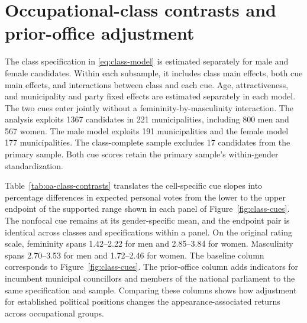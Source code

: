 \documentclass[11pt,a4paper]{article}\usepackage[]{graphicx}\usepackage[]{xcolor}
\begin{document}
\FloatBarrier
\section{Occupational-class contrasts and prior-office adjustment}
\label{sec:oa-class}
The class specification in \autoref{eq:class-model} is estimated separately for male and female candidates. Within each subsample, it includes class main effects, both cue main effects, and interactions between class and each cue. Age, attractiveness, and municipality and party fixed effects are estimated separately in each model. The two cues enter jointly without a femininity-by-masculinity interaction. The analysis exploits 1367 candidates in 221 municipalities, including 800 men and 567 women. The male model exploits 191 municipalities and the female model 177 municipalities. The class-complete sample excludes 17 candidates from the primary sample. Both cue scores retain the primary sample's within-gender standardization.

Table~\ref{tab:oa-class-contrasts} translates the cell-specific cue slopes into percentage differences in expected personal votes from the lower to the upper endpoint of the supported range shown in each panel of Figure~\ref{fig:class-cues}. The nonfocal cue remains at its gender-specific mean, and the endpoint pair is identical across classes and specifications within a panel. On the original rating scale, femininity spans 1.42--2.22 for men and 2.85--3.84 for women. Masculinity spans 2.70--3.53 for men and 1.72--2.46 for women. The baseline column corresponds to Figure~\ref{fig:class-cues}. The prior-office column adds indicators for incumbent municipal councillors and members of the national parliament to the same specification and sample. Comparing these columns shows how adjustment for established political positions changes the appearance-associated returns across occupational groups.
\end{document}
